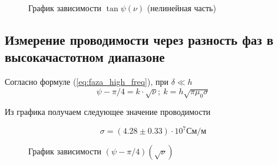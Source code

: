 \documentclass[a4paper]{article}
\begin{document}
\begin{figure}[h]
    \caption{График зависимости $\tan \psi (\nu)$ (нелинейная часть)}\label{fig:tg_psi_nu_no_line}
    \newpage
\end{figure}

\subsection{Измерение проводимости через разность фаз в высокачастотном диапазоне}
Согласно формуле (\ref{eq:faza_high_freq}), при $\delta \ll h$
\begin{equation*}
    \psi - \pi/4 = k\cdot \sqrt{\nu}; \ k = h\sqrt{\pi\mu_0\sigma}
\end{equation*}

Из графика получаем следующее значение проводимости

\begin{equation}
    \sigma = (4.28 \pm 0.33) \cdot 10^7 См/м
\end{equation}

\newpage

\begin{figure}[h]
    \caption{График зависимости $(\psi - \pi/4)(\sqrt{\nu})$}\label{fig:psi_sqrt_nu}
    \newpage
\end{figure}
\end{document}
